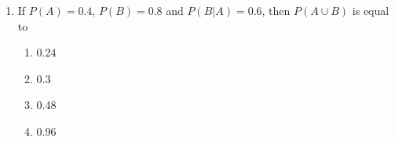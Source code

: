 \begin{enumerate}[resume*]
\solution

\item If $P(A)=0.4$, $P(B)=0.8$ and $P(B|A)=0.6$, then $P(A \cup B)$ is equal to
\begin{enumerate}
\item 0.24\\
\item 0.3\\
\item 0.48\\
\item 0.96
\end{enumerate}
\solution

\end{enumerate}
